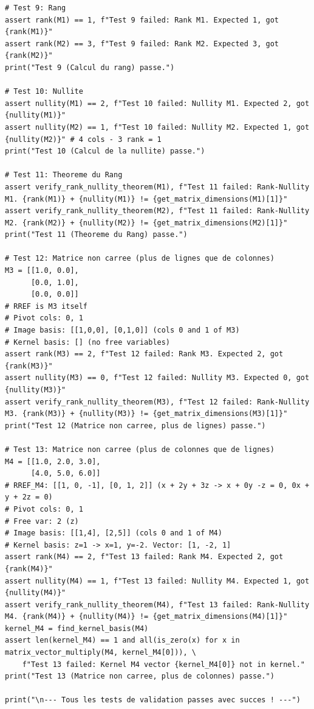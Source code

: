 \documentclass{report}
\begin{document}
\begin{verbatim}
# Test 9: Rang
assert rank(M1) == 1, f"Test 9 failed: Rank M1. Expected 1, got {rank(M1)}"
assert rank(M2) == 3, f"Test 9 failed: Rank M2. Expected 3, got {rank(M2)}"
print("Test 9 (Calcul du rang) passe.")

# Test 10: Nullite
assert nullity(M1) == 2, f"Test 10 failed: Nullity M1. Expected 2, got {nullity(M1)}"
assert nullity(M2) == 1, f"Test 10 failed: Nullity M2. Expected 1, got {nullity(M2)}" # 4 cols - 3 rank = 1
print("Test 10 (Calcul de la nullite) passe.")

# Test 11: Theoreme du Rang
assert verify_rank_nullity_theorem(M1), f"Test 11 failed: Rank-Nullity M1. {rank(M1)} + {nullity(M1)} != {get_matrix_dimensions(M1)[1]}"
assert verify_rank_nullity_theorem(M2), f"Test 11 failed: Rank-Nullity M2. {rank(M2)} + {nullity(M2)} != {get_matrix_dimensions(M2)[1]}"
print("Test 11 (Theoreme du Rang) passe.")

# Test 12: Matrice non carree (plus de lignes que de colonnes)
M3 = [[1.0, 0.0],
      [0.0, 1.0],
      [0.0, 0.0]]
# RREF is M3 itself
# Pivot cols: 0, 1
# Image basis: [[1,0,0], [0,1,0]] (cols 0 and 1 of M3)
# Kernel basis: [] (no free variables)
assert rank(M3) == 2, f"Test 12 failed: Rank M3. Expected 2, got {rank(M3)}"
assert nullity(M3) == 0, f"Test 12 failed: Nullity M3. Expected 0, got {nullity(M3)}"
assert verify_rank_nullity_theorem(M3), f"Test 12 failed: Rank-Nullity M3. {rank(M3)} + {nullity(M3)} != {get_matrix_dimensions(M3)[1]}"
print("Test 12 (Matrice non carree, plus de lignes) passe.")

# Test 13: Matrice non carree (plus de colonnes que de lignes)
M4 = [[1.0, 2.0, 3.0],
      [4.0, 5.0, 6.0]]
# RREF_M4: [[1, 0, -1], [0, 1, 2]] (x + 2y + 3z -> x + 0y -z = 0, 0x + y + 2z = 0)
# Pivot cols: 0, 1
# Free var: 2 (z)
# Image basis: [[1,4], [2,5]] (cols 0 and 1 of M4)
# Kernel basis: z=1 -> x=1, y=-2. Vector: [1, -2, 1]
assert rank(M4) == 2, f"Test 13 failed: Rank M4. Expected 2, got {rank(M4)}"
assert nullity(M4) == 1, f"Test 13 failed: Nullity M4. Expected 1, got {nullity(M4)}"
assert verify_rank_nullity_theorem(M4), f"Test 13 failed: Rank-Nullity M4. {rank(M4)} + {nullity(M4)} != {get_matrix_dimensions(M4)[1]}"
kernel_M4 = find_kernel_basis(M4)
assert len(kernel_M4) == 1 and all(is_zero(x) for x in matrix_vector_multiply(M4, kernel_M4[0])), \
    f"Test 13 failed: Kernel M4 vector {kernel_M4[0]} not in kernel."
print("Test 13 (Matrice non carree, plus de colonnes) passe.")

print("\n--- Tous les tests de validation passes avec succes ! ---")



\end{verbatim}
\end{document}

